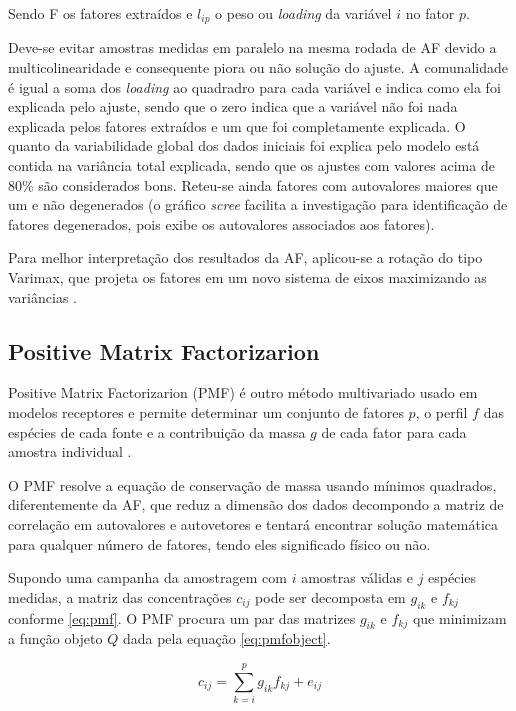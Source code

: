 Sendo F os fatores extraídos e $l_{ip}$ o peso ou \textit{loading} 
da variável $i$ no fator $p$.

Deve-se evitar amostras medidas em paralelo na mesma rodada de AF devido a 
multicolinearidade e consequente piora ou não solução do ajuste.  
A comunalidade é igual a soma dos \textit{loading} ao quadradro 
para cada variável e indica como ela foi explicada pelo ajuste, sendo que o zero
indica que a variável não foi nada explicada pelos fatores extraídos 
e um que foi completamente explicada. 
O quanto da variabilidade global dos dados iniciais foi explica pelo modelo está 
contida na variância total explicada, sendo que os ajustes com valores 
acima de 80\% são considerados bons. 
Reteu-se ainda fatores com autovalores maiores que um e não degenerados 
(o gráfico \textit{scree} facilita a investigação para identificação de fatores 
degenerados, pois exibe os autovalores associados aos fatores). 

Para melhor interpretação dos resultados da AF, aplicou-se a rotação do tipo 
Varimax, que projeta os fatores em um novo sistema de eixos maximizando 
as variâncias \citep{kaiser1958}.

\subsection{Positive Matrix Factorizarion}

Positive Matrix Factorizarion (PMF) é outro método multivariado usado
em modelos receptores e permite determinar um conjunto de fatores $p$, 
o perfil $f$ das espécies de cada fonte e a contribuição da massa $g$ 
de cada fator para cada amostra individual \citep{norris2014}. 

O PMF resolve a equação de conservação de massa usando mínimos 
quadrados, diferentemente da AF, que reduz a dimensão dos 
dados decompondo a matriz de correlação em autovalores e autovetores e 
tentará encontrar solução matemática para qualquer número de fatores, tendo
eles significado físico ou não. 

Supondo uma campanha da amostragem com $i$ amostras válidas e 
$j$ espécies medidas, a matriz das concentrações $c_{ij}$ 
pode ser decomposta em $g_{ik}$ e $f_{kj}$ conforme \ref{eq:pmf}. 
O PMF procura um par das matrizes $g_{ik}$ e $f_{kj}$ que
minimizam a função objeto $Q$ dada pela equação \ref{eq:pmfobject}. 

\begin{equation}
  c_{ij} = \sum_{k=i}^p g_{ik}f_{kj} + e_{ij}
  \label{eq:pmf}
\end{equation}

